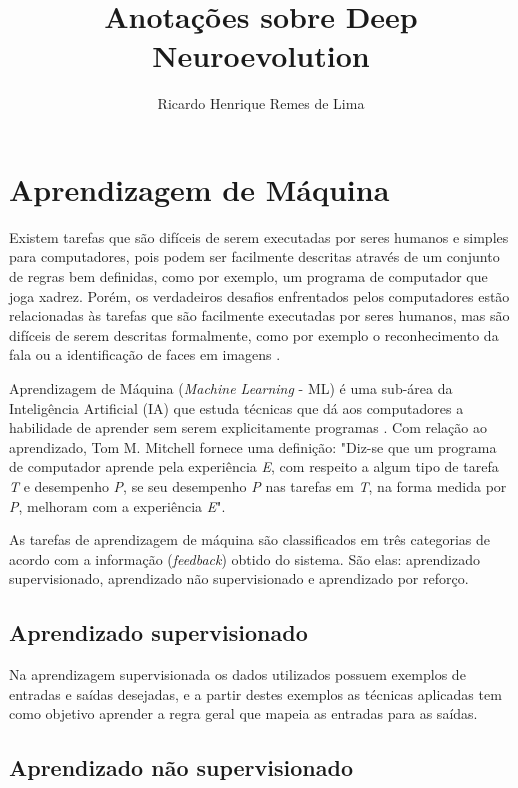 \documentclass[12pt]{article}
\title{Anotações sobre Deep Neuroevolution}
\author{Ricardo Henrique Remes de Lima \inst{1}}
\begin{document}
 

\maketitle

\section{Aprendizagem de Máquina}


Existem tarefas que são difíceis de serem executadas por seres humanos e simples para computadores, pois podem ser facilmente descritas através de um conjunto de regras bem definidas, como por exemplo, um programa de computador que joga xadrez. Porém, os verdadeiros desafios enfrentados pelos computadores estão relacionadas às tarefas que são facilmente executadas por seres humanos, mas são difíceis de serem descritas formalmente, como por exemplo o reconhecimento da fala ou a identificação de faces em imagens \cite{goodfellow2016deep}.


Aprendizagem de Máquina (\textit{Machine Learning} - ML) é uma sub-área da Inteligência Artificial (IA) que estuda técnicas que dá aos computadores a habilidade de aprender sem serem explicitamente programas \cite{simon2013big}. Com relação ao aprendizado, Tom M. Mitchell \cite{mitchell1997machine} fornece uma definição: "Diz-se que um programa de computador aprende pela experiência \textit{E}, com respeito a algum tipo de tarefa \textit{T} e desempenho \textit{P}, se seu desempenho \textit{P} nas tarefas em \textit{T}, na forma medida por \textit{P}, melhoram com a experiência \textit{E}".


As tarefas de aprendizagem de máquina são classificados em três categorias de acordo com a informação (\textit{feedback}) obtido do sistema. São elas: aprendizado supervisionado, aprendizado não supervisionado e aprendizado por reforço.


\subsection{Aprendizado supervisionado}


Na aprendizagem supervisionada os dados utilizados possuem exemplos de entradas e saídas desejadas, e a partir destes exemplos as técnicas aplicadas tem como objetivo aprender a regra geral que mapeia as entradas para as saídas.


\subsection{Aprendizado não supervisionado}
\end{document}
